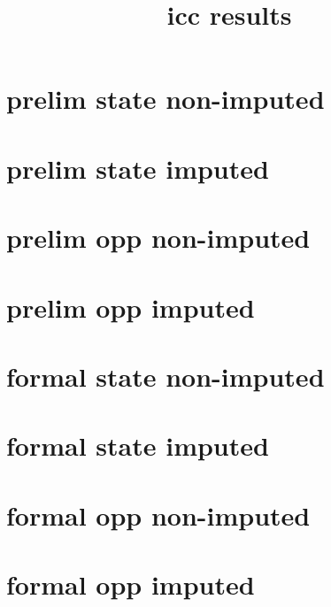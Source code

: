 \documentclass[]{article}
\begin{document}
\title{icc results}
\maketitle
\clearpage

\section*{prelim state non-imputed}



\clearpage
\section*{prelim state imputed}



\clearpage
\section*{prelim opp non-imputed}



\clearpage
\section*{prelim opp imputed}



\clearpage
\section*{formal state non-imputed}



\clearpage
\section*{formal state imputed}



\clearpage
\section*{formal opp non-imputed}



\clearpage
\section*{formal opp imputed}


\end{document}
